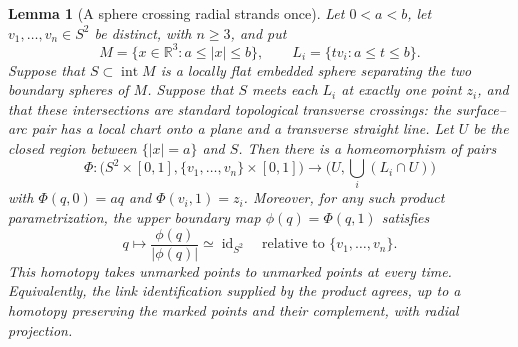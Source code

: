 \documentclass[11pt]{article}
\numberwithin{equation}{section}
\newtheorem{lemma}[theorem]{Lemma}
\theoremstyle{definition}
\theoremstyle{remark}
\newcommand{\R}{\mathbb R}
\newcommand{\Id}{\operatorname{id}}
\begin{document}
\begin{lemma}[A sphere crossing radial strands once]\label{lt:punctured-product}\label{lt:ray-product}
Let $0<a<b$, let $v_1,\ldots,v_n\in S^2$ be distinct, with $n\geq3$, and put
\[
 M=\{x\in\R^3:a\leq |x|\leq b\},\qquad
 L_i=\{t v_i:a\leq t\leq b\}.
\]
Suppose that $S\subset\operatorname{int}M$ is a locally flat embedded
sphere separating the two boundary spheres of $M$.  Suppose that $S$
meets each $L_i$ at exactly one point $z_i$, and that these intersections
are standard topological transverse crossings: the surface--arc pair
has a local chart onto a plane and a transverse straight line.
Let $U$ be the closed region between $\{|x|=a\}$ and $S$.
Then there is a homeomorphism of pairs
\[
 \Phi:\bigl(S^2\times[0,1],\{v_1,\ldots,v_n\}\times[0,1]\bigr)
 \longrightarrow
 \bigl(U,\textstyle\bigcup_i(L_i\cap U)\bigr)
\]
with $\Phi(q,0)=a q$ and $\Phi(v_i,1)=z_i$.
Moreover, for any such product parametrization, the upper boundary map
$\phi(q)=\Phi(q,1)$ satisfies
\[
 q\longmapsto \frac{\phi(q)}{|\phi(q)|}\simeq\Id_{S^2}
 \quad\text{relative to }\{v_1,\ldots,v_n\}.
\]
This homotopy takes unmarked points to unmarked points at every time.
Equivalently, the link identification supplied by the product agrees,
up to a homotopy preserving the marked points and their complement,
with radial projection.
\end{lemma}
\end{document}
